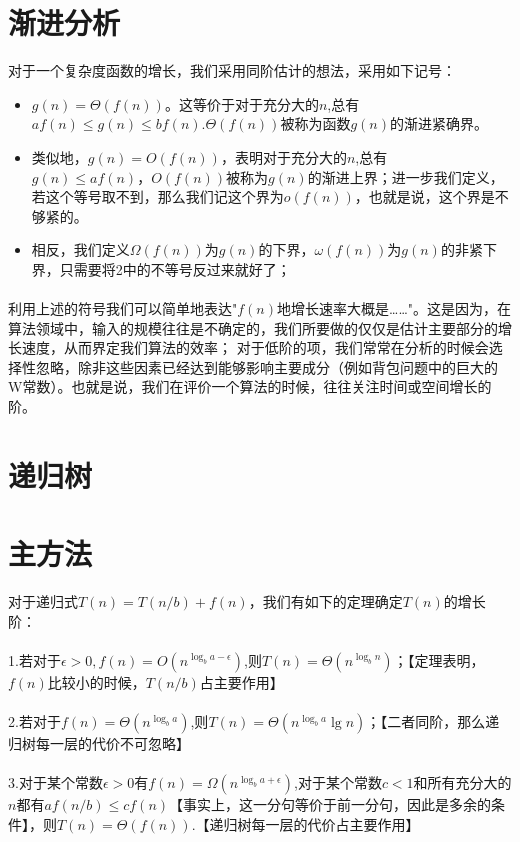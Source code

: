 \documentclass[12pt,a4paper,UTF16]{ctexbook}
\theoremstyle{plain}
\begin{document}
\section{渐进分析}
对于一个复杂度函数的增长，我们采用同阶估计的想法，采用如下记号：
\begin{itemize}
\item $g(n)=\Theta(f(n))$。这等价于对于充分大的$n$,总有$af(n)\leq g(n)\leq bf(n).\Theta(f(n))$被称为函数$g(n)$的渐进紧确界。
\item 类似地，$g(n)=O(f(n))$，表明对于充分大的$n$,总有$g(n)\leq af(n)，O(f(n))$被称为$g(n)$的渐进上界；进一步我们定义，若这个等号取不到，那么我们记这个界为$o(f(n))$，也就是说，这个界是不够紧的。
\item 相反，我们定义$\Omega(f(n))为g(n)$的下界，$\omega(f(n))$为$g(n)$的非紧下界，只需要将2中的不等号反过来就好了；
\end{itemize}
\paragraph{}利用上述的符号我们可以简单地表达"$f(n)$地增长速率大概是……"。这是因为，在算法领域中，输入的规模往往是不确定的，我们所要做的仅仅是估计主要部分的增长速度，从而界定我们算法的效率；
对于低阶的项，我们常常在分析的时候会选择性忽略，除非这些因素已经达到能够影响主要成分（例如背包问题中的巨大的W常数）。也就是说，我们在评价一个算法的时候，往往关注时间或空间增长的阶。
\section{递归树}
\section{主方法}
对于递归式$T(n)=T(n/b)+f(n)$，我们有如下的定理确定$T(n)$的增长阶：
\paragraph{}1.若对于$\epsilon >0,f(n)=O(n^{\log_ba-\epsilon})$,则$T(n)=\Theta(n^{\log_b n})$；【定理表明，$f(n)$比较小的时候，$T(n/b)$占主要作用】
\paragraph{}2.若对于$f(n)=\Theta(n^{\log_ba})$,则$T(n)=\Theta(n^{\log_ba}\lg n)$；【二者同阶，那么递归树每一层的代价不可忽略】
\paragraph{}3.对于某个常数$\epsilon>0$有$f(n)=\Omega(n^{\log_ba+\epsilon})$,对于某个常数$c<1$和所有充分大的$n$都有$af(n/b)\leq cf(n)$【事实上，这一分句等价于前一分句，因此是多余的条件】，则$T(n)=\Theta(f(n))$.【递归树每一层的代价占主要作用】
\end{document}

